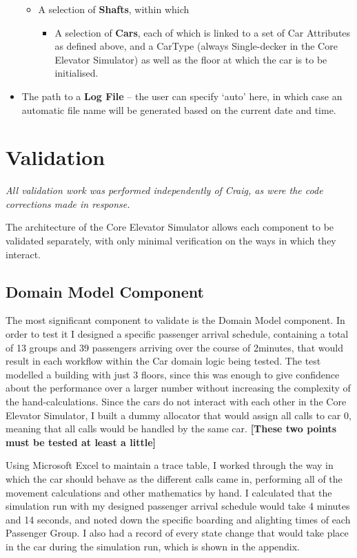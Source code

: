 \documentclass{UoYCSproject}
\begin{document}
\begin{itemize}
	\begin{itemize}
		\item A selection of \textbf{Shafts}, within which
		\begin{itemize}
			\item A selection of \textbf{Cars}, each of which is linked to a set of Car Attributes as defined above, and a CarType (always Single-decker in the Core Elevator Simulator) as well as the floor at which the car is to be initialised.
		\end{itemize}
	\end{itemize}
	\item The path to a \textbf{Log File} -- the user can specify `auto' here, in which case an automatic file name will be generated based on the current date and time.
\end{itemize}

\section{Validation}

\textit{All validation work was performed independently of Craig, as were the code corrections made in response.}

The architecture of the Core Elevator Simulator allows each component to be validated separately, with only minimal verification on the ways in which they interact.

\subsection{Domain Model Component}

The most significant component to validate is the Domain Model component.  In order to test it I designed a specific passenger arrival schedule, containing a total of 13 groups and 39 passengers arriving over the course of 2\textonehalf minutes, that would result in each workflow within the Car domain logic being tested.  The test modelled a building with just 3 floors, since this was enough to give confidence about the performance over a larger number without increasing the complexity of the hand-calculations.  Since the cars do not interact with each other in the Core Elevator Simulator, I built a dummy allocator that would assign all calls to car 0, meaning that all calls would be handled by the same car. \textbf{[These two points must be tested at least a little]}

Using Microsoft Excel to maintain a trace table, I worked through the way in which the car should behave as the different calls came in, performing all of the movement calculations and other mathematics by hand.  I calculated that the simulation run with my designed passenger arrival schedule would take 4 minutes and 14 seconds, and noted down the specific boarding and alighting times of each Passenger Group.  I also had a record of every state change that would take place in the car during the simulation run, which is shown in the appendix.
\end{document}
